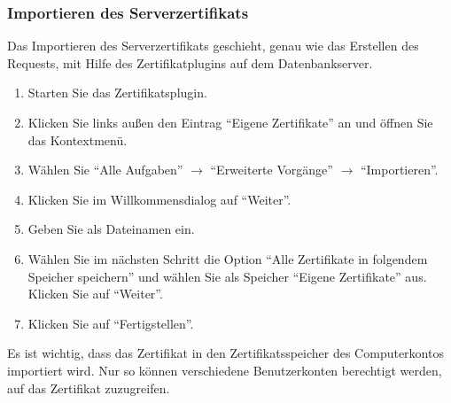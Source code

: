         \subsubsection{Importieren des Serverzertifikats}
          Das Importieren des Serverzertifikats geschieht, genau wie das
          Erstellen des Requests, mit Hilfe des Zertifikatplugins auf dem
          Datenbankserver.
          \begin{enumerate}
            \item Starten Sie das Zertifikatsplugin.
            \item Klicken Sie links außen den Eintrag \enquote{Eigene
            Zertifikate} an und öffnen Sie das Kontextmenü.
            \item Wählen Sie \enquote{Alle Aufgaben} $\rightarrow$
            \enquote{Erweiterte Vorgänge} $\rightarrow$
            \enquote{Importieren}.
            \item Klicken Sie im Willkommensdialog auf \enquote{Weiter}.
            \item Geben Sie als Dateinamen  ein.
            \item Wählen Sie im nächsten Schritt die Option \enquote{Alle
            Zertifikate in folgendem Speicher speichern} und wählen Sie als
            Speicher \enquote{Eigene Zertifikate} aus. Klicken Sie auf
            \enquote{Weiter}.
            \item Klicken Sie auf \enquote{Fertigstellen}.
          \end{enumerate}
          \begin{merke}
            Es ist wichtig, dass das Zertifikat in den Zertifikatsspeicher des
            Computerkontos importiert wird. Nur so können verschiedene
            Benutzerkonten berechtigt werden, auf das Zertifikat zuzugreifen.
          \end{merke}
